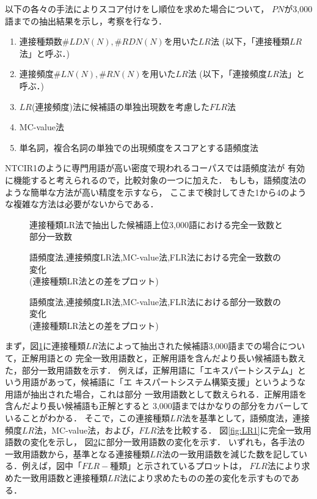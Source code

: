 以下の各々の手法によりスコア付けをし順位を求めた場合について，
$PN$が3,000語までの抽出結果を示し，考察を行なう．
\begin{enumerate}
 \item 連接種類数$\#LDN(N),\#RDN(N)$を用いた$LR$法 (以下，「連接種類$LR$法」と呼ぶ．)
 \item 連接頻度$\#LN(N),\#RN(N)$を用いた$LR$法 (以下，「連接頻度$LR$法」と呼ぶ．)
 \item $LR$(連接頻度)法に候補語の単独出現数を考慮した$FLR$法
 \item MC-value法
 \item 単名詞，複合名詞の単独での出現頻度をスコアとする語頻度法
\end{enumerate}
NTCIR1のように専門用語が高い密度で現われるコーパスでは語頻度法が
有効に機能すると考えられるので，比較対象の一つに加えた．
もしも，語頻度法のような簡単な方法が高い精度を示すなら，
ここまで検討してきた1から4のような複雑な方法は必要がないからである．
\begin{figure}[htbp]
\hspace*{\fill}
\hspace*{\fill}
\caption{連接種類LR法で抽出した候補語上位3,000語における完全一致数と部分一致数}
\label{fig:LR}
\end{figure}
\begin{figure}[htbp]
\hspace*{\fill}
\hspace*{\fill}
\caption{語頻度法,連接頻度LR法,MC-value法,FLR法における完全一致数の変化\\
         (連接種類LR法との差をプロット)}
\label{fig:LR1}

\vspace*{10ex}
\hspace*{\fill}
\hspace*{\fill}
\caption{語頻度法,連接頻度LR法,MC-value法,FLR法における部分一致数の変化\\
         (連接種類LR法との差をプロット)}
\label{fig:LR2}
\end{figure}

まず，図\ref{fig:LR}に連接種類$LR$法によって抽出された候補語3,000語までの場合について，正解用語との
完全一致用語数と，正解用語を含んだより長い候補語も数えた，部分一致用語数を示す．
例えば，正解用語に「エキスパートシステム」という用語があって，候補語に「エ
キスパートシステム構築支援」というような用語が抽出された場合，これは部分
一致用語数として数えられる．正解用語を含んだより長い候補語も正解とすると
3,000語まではかなりの部分をカバーしていることがわかる．
そこで，この連接種類$LR$法を基準として，語頻度法，連接頻度$LR$法，MC-value法，および，$FLR$法を比較する．
図\ref{fig:LR1}に完全一致用語数の変化を示し，
図\ref{fig:LR2}に部分一致用語数の変化を示す．
いずれも，各手法の一致用語数から，基準となる連接種類$LR$法の一致用語数を減じた数を記している．例えば，図中「$FLR-$種類」と示されているプロットは，
$FLR$法により求めた一致用語数と連接種類$LR$法により求めたものの差の変化を示すものである．


